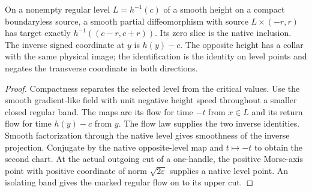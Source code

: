 \begin{theorem}
\label{thm:ed03-native-height-collar}
\leanok
On a nonempty regular level $L=h^{-1}(c)$ of a smooth height on a compact
boundaryless source, a smooth partial diffeomorphism with source
$L\times(-r,r)$ has target exactly $h^{-1}((c-r,c+r))$. Its zero slice is
the native inclusion. The inverse signed coordinate at $y$ is $h(y)-c$.
The opposite height has a collar with the same physical image; the
identification is the identity on level points and negates the transverse
coordinate in both directions.
\end{theorem}
\begin{proof}
\leanok
Compactness separates the selected level from the critical values.
Use the smooth gradient-like field with unit negative height speed
throughout a smaller closed regular band. The maps are its flow for time
$-t$ from $x\in L$ and its return flow for time $h(y)-c$ from $y$. The
flow law supplies the two inverse identities. Smooth factorization through
the native level gives smoothness of the inverse projection. Conjugate
by the native opposite-level map and $t\mapsto-t$ to obtain the second chart.
At the actual outgoing cut of a one-handle, the positive Morse-axis point
with positive coordinate of norm $\sqrt{2\varepsilon}$ supplies a native
level point. An isolating band gives the marked regular flow on to its upper cut.
\end{proof}

